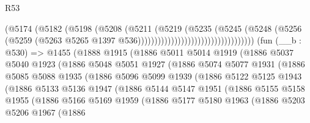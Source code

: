 \begin{lexlean}{R53}
\begin{coremodule}
                                                  (@5174
                                                    (@5182
                                                      (@5198
                                                        (@5208
                                                          (@5211
                                                            (@5219
                                                              (@5235
                                                                (@5245
                                                                  (@5248
                                                                    (@5256
                                                                      (@5259
                                                                        (@5263
                                                                          @5265
                                                                          @1397
                                                                          @536)))))))))))))))))))))))))))))))))))
    (fun (__b : @530) =>
    @1455
      (@1888
        @1915
        (@1886
          @5011
          @5014
          @1919
          (@1886
            @5037
            @5040
            @1923
            (@1886
              @5048
              @5051
              @1927
              (@1886
                @5074
                @5077
                @1931
                (@1886
                  @5085
                  @5088
                  @1935
                  (@1886
                    @5096
                    @5099
                    @1939
                    (@1886
                      @5122
                      @5125
                      @1943
                      (@1886
                        @5133
                        @5136
                        @1947
                        (@1886
                          @5144
                          @5147
                          @1951
                          (@1886
                            @5155
                            @5158
                            @1955
                            (@1886
                              @5166
                              @5169
                              @1959
                              (@1886
                                @5177
                                @5180
                                @1963
                                (@1886
                                  @5203
                                  @5206
                                  @1967
                                  (@1886

\end{coremodule}
\end{lexlean}
